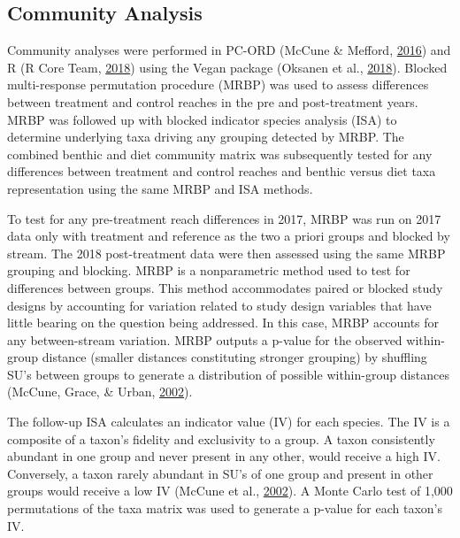 \documentclass[double,12pt]{beavtex}
\begin{document}
  \subsection*{Community Analysis}\label{community-analysis}
  
  Community analyses were performed in PC-ORD (McCune \& Mefford,
  \protect\hyperlink{ref-PC-ORD}{2016}) and R (R Core Team,
  \protect\hyperlink{ref-R-base}{2018}) using the Vegan package (Oksanen
  et al., \protect\hyperlink{ref-vegan}{2018}). Blocked multi-response
  permutation procedure (MRBP) was used to assess differences between
  treatment and control reaches in the pre and post-treatment years. MRBP
  was followed up with blocked indicator species analysis (ISA) to
  determine underlying taxa driving any grouping detected by MRBP. The
  combined benthic and diet community matrix was subsequently tested for
  any differences between treatment and control reaches and benthic versus
  diet taxa representation using the same MRBP and ISA methods.
  
  To test for any pre-treatment reach differences in 2017, MRBP was run on
  2017 data only with treatment and reference as the two a priori groups
  and blocked by stream. The 2018 post-treatment data were then assessed
  using the same MRBP grouping and blocking. MRBP is a nonparametric
  method used to test for differences between groups. This method
  accommodates paired or blocked study designs by accounting for variation
  related to study design variables that have little bearing on the
  question being addressed. In this case, MRBP accounts for any
  between-stream variation. MRBP outputs a p-value for the observed
  within-group distance (smaller distances constituting stronger grouping)
  by shuffling SU's between groups to generate a distribution of possible
  within-group distances (McCune, Grace, \& Urban,
  \protect\hyperlink{ref-McCune2002}{2002}).
  
  The follow-up ISA calculates an indicator value (IV) for each species.
  The IV is a composite of a taxon's fidelity and exclusivity to a group.
  A taxon consistently abundant in one group and never present in any
  other, would receive a high IV. Conversely, a taxon rarely abundant in
  SU's of one group and present in other groups would receive a low IV
  (McCune et al., \protect\hyperlink{ref-McCune2002}{2002}). A Monte Carlo
  test of 1,000 permutations of the taxa matrix was used to generate a
  p-value for each taxon's IV.
  
\end{document}
